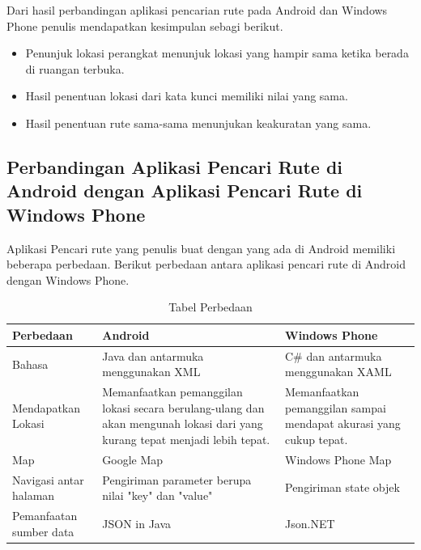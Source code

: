 	\hspace{0.5cm} Dari hasil perbandingan aplikasi pencarian rute pada Android dan Windows Phone penulis mendapatkan kesimpulan sebagi berikut.
	
	\begin{itemize}
		\item Penunjuk lokasi perangkat menunjuk lokasi yang hampir sama ketika berada di ruangan terbuka.
		\item Hasil penentuan lokasi dari kata kunci memiliki nilai yang sama.
		\item Hasil penentuan rute sama-sama menunjukan keakuratan yang sama.
	\end{itemize}
	
\subsection{Perbandingan Aplikasi Pencari Rute di Android dengan Aplikasi Pencari Rute di Windows Phone}
\label{lab:Perbandingan}
\hspace{0.5cm} Aplikasi Pencari rute yang penulis buat dengan yang ada di Android memiliki beberapa perbedaan. Berikut perbedaan antara aplikasi pencari rute di Android dengan Windows Phone.

\begin{table}[h]
	\centering
		\begin{tabular}{|p{4cm}|p{4cm}|p{4cm}|}\hline
				Perbedaan & Android & Windows Phone \\ \hline
				Bahasa & Java dan antarmuka menggunakan XML & C\# dan antarmuka menggunakan XAML \\ \hline
				Mendapatkan Lokasi & Memanfaatkan pemanggilan lokasi secara berulang-ulang dan akan mengunah lokasi dari yang kurang tepat menjadi lebih tepat. & Memanfaatkan pemanggilan sampai mendapat akurasi yang cukup tepat. \\ \hline
				Map  & Google Map & Windows Phone Map \\ \hline
				Navigasi antar halaman  & Pengiriman parameter berupa nilai "key" dan "value" & Pengiriman state objek \\ \hline
				Pemanfaatan sumber data & JSON in Java & Json.NET \\ \hline
		\end{tabular}
	\caption{Tabel Perbedaan}
	\label{tab:TabelPerbedaan}
\end{table}